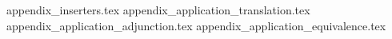 \documentclass[acmsmall,anonymous,screen,review]{acmart}
\theoremstyle{acmdefinition}
\begin{document}



\appendix
{appendix_inserters.tex}
{appendix_application_translation.tex}
{appendix_application_adjunction.tex}
{appendix_application_equivalence.tex}
\end{document}
